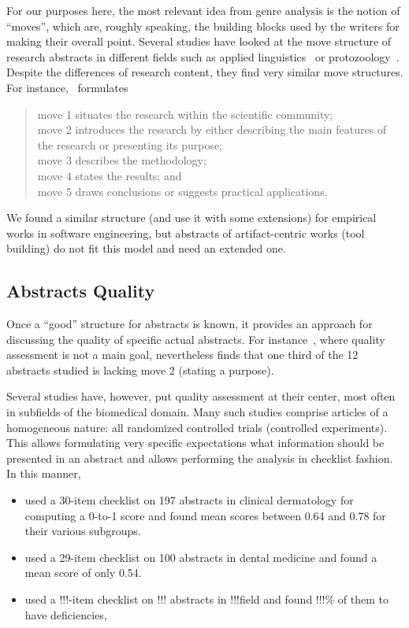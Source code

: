 \documentclass[10pt,journal,compsoc]{IEEEtran}
\begin{document}
For our purposes here, the most relevant idea from genre analysis is the notion
of ``moves'', which are, roughly speaking, the building blocks used by the writers
for making their overall point.
Several studies have looked at the move structure of research abstracts
in different fields such as 
applied linguistics~\cite{DosSantos96} or
protozoology~\cite{CroOpp06}.
Despite the differences of research content, they find very similar move structures.
For instance,~\cite{CroOpp06} formulates
\begin{quote}
	move 1 situates the research within the scientific community;\\
	move 2 introduces the research by either describing the main features of the
    research or presenting its purpose;\\
	move 3 describes the methodology;\\
	move 4 states the results; and\\
    move 5 draws conclusions or suggests practical applications.
\end{quote}
We found a similar structure (and use it with some extensions)
for empirical works in software engineering, 
but abstracts of artifact-centric works (tool building) do not fit this model and need
an extended one.


\subsection{Abstracts Quality}

Once a ``good'' structure for abstracts is known, it provides an approach for
discussing the quality of specific actual abstracts.
For instance~\cite{CroOpp06}, where quality assessment is not a main goal,
nevertheless finds that one third of the 12 abstracts studied
is lacking move 2 (stating a purpose).

Several studies have, however, put quality assessment at their center,
most often in subfields of the biomedical domain.
Many such studies comprise articles of a homogeneous nature:
all randomized controlled trials (controlled experiments).
This allows formulating very specific expectations what information should be
presented in an abstract and allows performing the analysis in checklist fashion.
In this manner,
\begin{itemize}
  \item \cite{DupKhoLeb03} used a 30-item checklist on 197 abstracts in clinical dermatology
     for computing a 0-to-1 score and found mean scores between 0.64 and 0.78 for their various subgroups.
  \item \cite{ShaHar06} used a 29-item checklist on 100 abstracts in dental medicine
	 and found a mean score of only 0.54.
  \item \cite{} used a !!!-item checklist on !!! abstracts in !!!field
	 and found !!!\% of them to have deficiencies,
\end{itemize}
\end{document}
